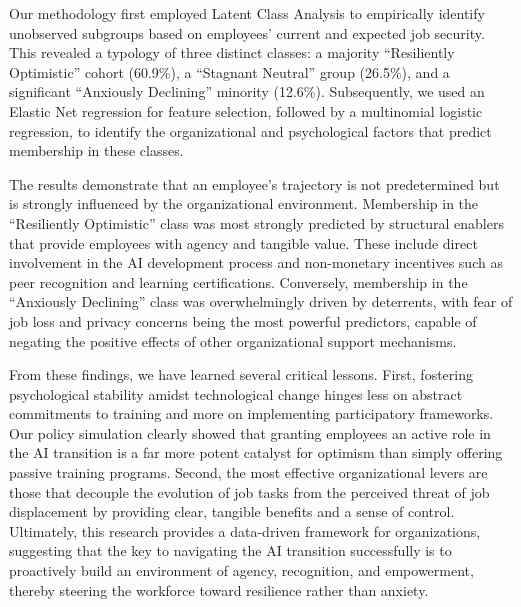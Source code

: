 \documentclass[]{article}
\begin{document}
Our methodology first employed Latent Class Analysis to empirically identify unobserved subgroups based on employees' current and expected job security. This revealed a typology of three distinct classes: a majority ``Resiliently Optimistic'' cohort (60.9\%), a ``Stagnant Neutral'' group (26.5\%), and a significant ``Anxiously Declining'' minority (12.6\%). Subsequently, we used an Elastic Net regression for feature selection, followed by a multinomial logistic regression, to identify the organizational and psychological factors that predict membership in these classes.

The results demonstrate that an employee's trajectory is not predetermined but is strongly influenced by the organizational environment. Membership in the ``Resiliently Optimistic'' class was most strongly predicted by structural enablers that provide employees with agency and tangible value. These include direct involvement in the AI development process and non-monetary incentives such as peer recognition and learning certifications. Conversely, membership in the ``Anxiously Declining'' class was overwhelmingly driven by deterrents, with fear of job loss and privacy concerns being the most powerful predictors, capable of negating the positive effects of other organizational support mechanisms.

From these findings, we have learned several critical lessons. First, fostering psychological stability amidst technological change hinges less on abstract commitments to training and more on implementing participatory frameworks. Our policy simulation clearly showed that granting employees an active role in the AI transition is a far more potent catalyst for optimism than simply offering passive training programs. Second, the most effective organizational levers are those that decouple the evolution of job tasks from the perceived threat of job displacement by providing clear, tangible benefits and a sense of control. Ultimately, this research provides a data-driven framework for organizations, suggesting that the key to navigating the AI transition successfully is to proactively build an environment of agency, recognition, and empowerment, thereby steering the workforce toward resilience rather than anxiety.


{}

\end{document}
